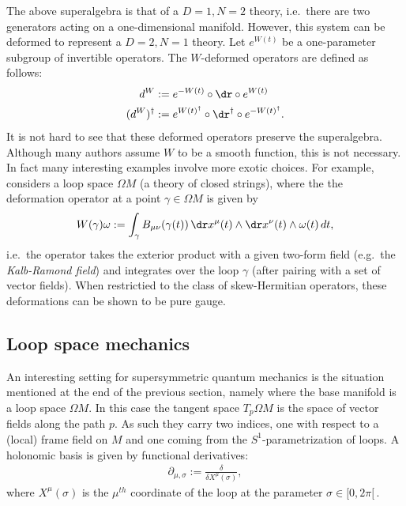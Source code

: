     The above superalgebra is that of a $D=1,N=2$ theory, i.e.~there are two generators acting on a one-dimensional manifold. However, this system can be deformed to represent a $D=2,N=1$ theory. Let $e^{W(t)}$ be a one-parameter subgroup of invertible operators. The $W$-deformed operators are defined as follows:
    \begin{align}
        d^W &:= e^{-W(t)}\circ\dr\circ e^{W(t)}\\
        (d^W)^\dagger &:= e^{W(t)^\dagger}\circ\dr^\dagger\circ e^{-W(t)^\dagger}.
    \end{align}
    It is not hard to see that these deformed operators preserve the superalgebra. Although many authors assume $W$ to be a smooth function, this is not necessary. In fact many interesting examples involve more exotic choices. For example, \cite{phd_schreiber} considers a loop space $\Omega M$ (a theory of closed strings), where the the deformation operator at a point $\gamma\in\Omega M$ is given by
    \begin{gather}
        W(\gamma)\omega := \int_\gamma B_{\mu\nu}(\gamma(t))\,\dr x^\mu(t)\wedge\dr x^\nu(t)\wedge\omega(t)\,dt,
    \end{gather}
    i.e.~the operator takes the exterior product with a given two-form field (e.g.~the \textit{Kalb-Ramond field}) and integrates over the loop $\gamma$ (after pairing with a set of vector fields). When restrictied to the class of skew-Hermitian operators, these deformations can be shown to be pure gauge.

\subsection{Loop space mechanics}

    An interesting setting for supersymmetric quantum mechanics is the situation mentioned at the end of the previous section, namely where the base manifold is a loop space $\Omega M$. In this case the tangent space $T_p\Omega M$ is the space of vector fields along the path $p$. As such they carry two indices, one with respect to a (local) frame field on $M$ and one coming from the $S^1$-parametrization of loops. A holonomic basis is given by functional derivatives:
    \begin{gather}
        \partial_{\mu,\sigma} := \frac{\delta}{\delta X^\mu(\sigma)},
    \end{gather}
    where $X^\mu(\sigma)$ is the $\mu^{th}$ coordinate of the loop at the parameter $\sigma\in[0,2\pi[\,$.

